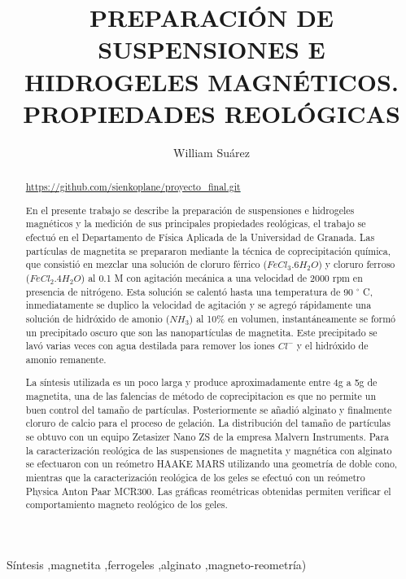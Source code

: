 \documentclass[review]{elsarticle}
\begin{document}
\begin{frontmatter}
\title{PREPARACI\'ON DE SUSPENSIONES E HIDROGELES MAGN\'ETICOS. PROPIEDADES REOL\'OGICAS}


\author[a]{William Su\'arez}
\address[a]{Afiliaci\'on X1.}



\begin{abstract}

\textcolor{cyan}{\underline{\url{https://github.com/sienkoplane/proyecto_final.git}}}

En el presente trabajo se describe la preparaci\'on de suspensiones e hidrogeles magn\'eticos y la medici\'on de sus principales propiedades reol\'ogicas, el trabajo se efectu\'o en el Departamento de F\'isica Aplicada de la Universidad de Granada. Las part\'iculas de magnetita se prepararon mediante la t\'ecnica de coprecipitaci\'on qu\'imica, que consisti\'o en mezclar una soluci\'on de cloruro f\'errico ($Fe Cl_{3} .6 H_{2}O$) y cloruro ferroso ($Fe Cl_{2} .4 H_{2}O$) al 0.1 M con agitaci\'on mec\'anica a una velocidad de 2000 rpm en presencia de nitr\'ogeno. Esta soluci\'on se calent\'o hasta una temperatura de 90 {\ensuremath{{}^\circ}} C, inmediatamente se duplico la velocidad de agitaci\'on y se agreg\'o r\'apidamente una soluci\'on de hidr\'oxido de amonio ($NH_3$) al 10\% en volumen, instant\'aneamente se form\'o un precipitado oscuro que son las nanopart\'iculas de magnetita.
Este precipitado se lav\'o varias veces con agua destilada para remover los iones $C l^{ -}$ y el hidr\'oxido de amonio remanente.

La s\'intesis utilizada es un poco larga y produce aproximadamente entre 4g a 5g de magnetita, una de las falencias de m\'etodo de coprecipitacion es que no permite un buen control del tama\~no de part\'iculas. Posteriormente se a\~nadi\'o alginato y finalmente cloruro de calcio para el proceso de gelaci\'on. La distribuci\'on del tama\~no de part\'iculas se obtuvo con un equipo Zetasizer Nano ZS de la empresa Malvern Instruments. Para la caracterizaci\'on reol\'ogica de las suspensiones de magnetita y magn\'etica con alginato se efectuaron con un re\'ometro HAAKE MARS utilizando una geometr\'ia de doble cono, mientras que la caracterizaci\'on reol\'ogica de los geles se efectu\'o con un re\'ometro Physica Anton Paar MCR300. Las gr\'aficas reom\'etricas obtenidas permiten verificar
el comportamiento magneto reol\'ogico de los geles.

\end{abstract}

\begin{keyword}
S\'intesis \sep magnetita \sep ferrogeles \sep alginato \sep magneto-reometr\'ia)
\end{keyword}

\end{frontmatter}
\end{document}
